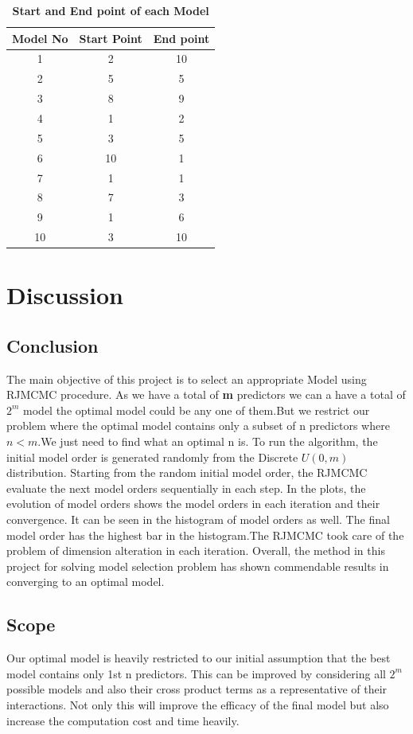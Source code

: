 \documentclass[12pt,a4paper]{article}
\begin{document}
 \begin{table}[h!]
 \centering
\begin{tabular}{ |c|c|c| } 
 \hline
 \textbf{Model No} & \textbf{Start Point} & \textbf{End point} \\ 
 \hline
 1 & 2 & 10 \\ 
 \hline
 2 & 5 & 5 \\ 
 \hline
  3 & 8 & 9 \\ 
 \hline
  4 & 1 & 2 \\ 
 \hline
  5 & 3 & 5 \\ 
 \hline
  6 & 10 & 1 \\ 
 \hline
  7 & 1 & 1 \\ 
 \hline
  8 & 7 & 3 \\ 
 \hline
  9 & 1 & 6 \\ 
 \hline
  10 & 3 & 10 \\ 
 \hline
\end{tabular}

\caption{\textbf{Start and End point of each Model}}

\end{table}

\section{Discussion}
\subsection{Conclusion}
The main objective of this project is to select an appropriate Model using RJMCMC procedure. As we have a total of \textbf{m} predictors we can a have a total of $2^m$ model the optimal model could be any one of them.But we restrict our problem where the optimal model contains only a subset of n predictors where $n<m$.We just need to find what an optimal n is.
To run the algorithm, the initial model order is generated randomly from the Discrete $U(0,m)$ distribution. Starting from the random initial model order, the RJMCMC evaluate the next model orders sequentially in each step. In the plots, the evolution of model orders shows the model orders in each iteration and their convergence. It can be seen in the histogram of model orders as well. The final model order has the highest bar in the histogram.The RJMCMC took care of the problem of dimension alteration in each iteration. Overall, the method in this project for solving model selection problem has shown commendable results in converging to an optimal model.
\subsection{Scope}
Our optimal model is heavily restricted to our initial assumption that the best model contains only 1st n predictors. This can be improved by considering all $2^m$ possible models and also their cross product terms as a representative of their interactions. Not only this will improve the efficacy of the final model but also increase the computation cost and time heavily.
\end{document}
